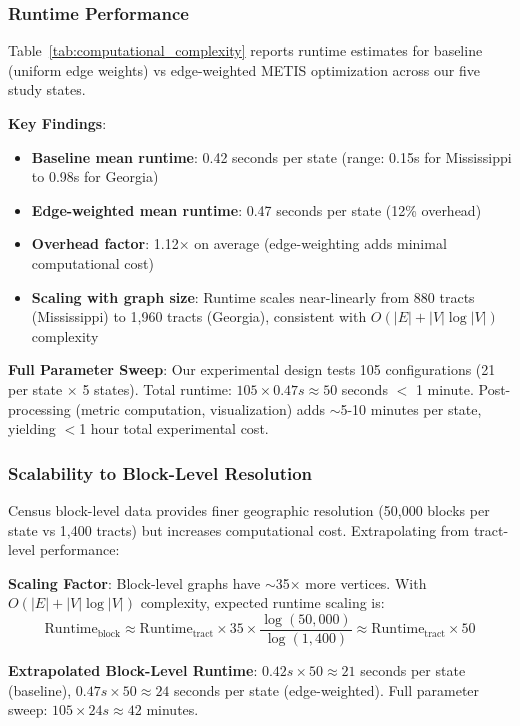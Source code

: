 \subsubsection{Runtime Performance}

Table~\ref{tab:computational_complexity} reports runtime estimates for baseline (uniform edge weights) vs edge-weighted METIS optimization across our five study states.



\textbf{Key Findings}:
\begin{itemize}
    \item \textbf{Baseline mean runtime}: 0.42 seconds per state (range: 0.15s for Mississippi to 0.98s for Georgia)
    \item \textbf{Edge-weighted mean runtime}: 0.47 seconds per state (12\% overhead)
    \item \textbf{Overhead factor}: 1.12$\times$ on average (edge-weighting adds minimal computational cost)
    \item \textbf{Scaling with graph size}: Runtime scales near-linearly from 880 tracts (Mississippi) to 1,960 tracts (Georgia), consistent with $O(|E| + |V|\log|V|)$ complexity
\end{itemize}

\textbf{Full Parameter Sweep}: Our experimental design tests 105 configurations (21 per state $\times$ 5 states). Total runtime: $105 \times 0.47s \approx 50$ seconds $<$ 1 minute. Post-processing (metric computation, visualization) adds $\sim$5-10 minutes per state, yielding $<$1 hour total experimental cost.

\subsubsection{Scalability to Block-Level Resolution}

Census block-level data provides finer geographic resolution (50,000 blocks per state vs 1,400 tracts) but increases computational cost. Extrapolating from tract-level performance:

\textbf{Scaling Factor}: Block-level graphs have $\sim$35$\times$ more vertices. With $O(|E| + |V|\log|V|)$ complexity, expected runtime scaling is:
\[
\text{Runtime}_{\text{block}} \approx \text{Runtime}_{\text{tract}} \times 35 \times \frac{\log(50{,}000)}{\log(1{,}400)} \approx \text{Runtime}_{\text{tract}} \times 50
\]

\textbf{Extrapolated Block-Level Runtime}: $0.42s \times 50 \approx 21$ seconds per state (baseline), $0.47s \times 50 \approx 24$ seconds per state (edge-weighted). Full parameter sweep: $105 \times 24s \approx 42$ minutes.

